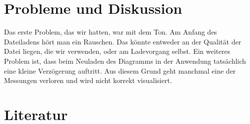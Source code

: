 \documentclass[conference,a4paper,flushend]{cs-techrep}
\begin{document}
\section{Probleme und Diskussion}
Das erste Problem, das wir hatten, war mit dem Ton. Am Anfang des Dateiladens hört man ein Rauschen. Das könnte entweder an der Qualität der Datei liegen, die wir verwenden, oder am Ladevorgang selbst. Ein weiteres Problem ist, dass beim Neuladen des Diagramms in der Anwendung tatsächlich eine kleine Verzögerung auftritt. Aus diesem Grund geht manchmal eine der Messungen verloren und wird nicht korrekt visualisiert.
\clearpage
\section{Literatur}
\nocite{*} %
\printbibliography %
\end{document}
